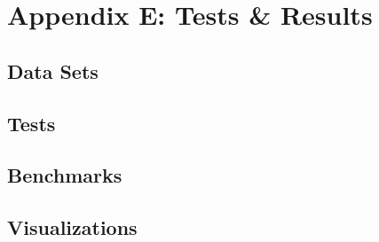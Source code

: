 \section{Appendix E: Tests \& Results}

 \subsection{Data Sets}

 \subsection{Tests}
 
 \subsection{Benchmarks}
 
 \subsection{Visualizations}
 
 
